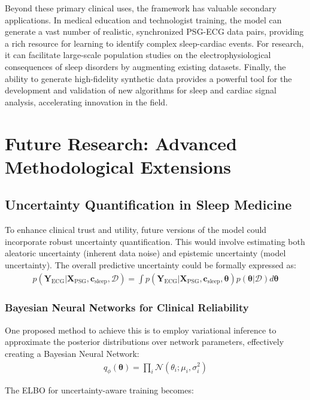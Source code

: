 \documentclass[11pt,en]{elegantpaper}
\begin{document}
Beyond these primary clinical uses, the framework has valuable secondary applications. In medical education and technologist training, the model can generate a vast number of realistic, synchronized PSG-ECG data pairs, providing a rich resource for learning to identify complex sleep-cardiac events. For research, it can facilitate large-scale population studies on the electrophysiological consequences of sleep disorders by augmenting existing datasets. Finally, the ability to generate high-fidelity synthetic data provides a powerful tool for the development and validation of new algorithms for sleep and cardiac signal analysis, accelerating innovation in the field.

\section{Future Research: Advanced Methodological Extensions}

\subsection{Uncertainty Quantification in Sleep Medicine}

To enhance clinical trust and utility, future versions of the model could incorporate robust uncertainty quantification. This would involve estimating both aleatoric uncertainty (inherent data noise) and epistemic uncertainty (model uncertainty). The overall predictive uncertainty could be formally expressed as:
\begin{align}
p(\mathbf{Y}_{\text{ECG}} | \mathbf{X}_{\text{PSG}}, \mathbf{c}_{\text{sleep}}, \mathcal{D}) = \int p(\mathbf{Y}_{\text{ECG}} | \mathbf{X}_{\text{PSG}}, \mathbf{c}_{\text{sleep}}, \boldsymbol{\theta}) p(\boldsymbol{\theta} | \mathcal{D}) d\boldsymbol{\theta}
\end{align}

\subsubsection{Bayesian Neural Networks for Clinical Reliability}
One proposed method to achieve this is to employ variational inference to approximate the posterior distributions over network parameters, effectively creating a Bayesian Neural Network:
\begin{align}
q_\phi(\boldsymbol{\theta}) = \prod_i \mathcal{N}(\theta_i; \mu_i, \sigma_i^2)
\end{align}

The ELBO for uncertainty-aware training becomes:
\end{document}
